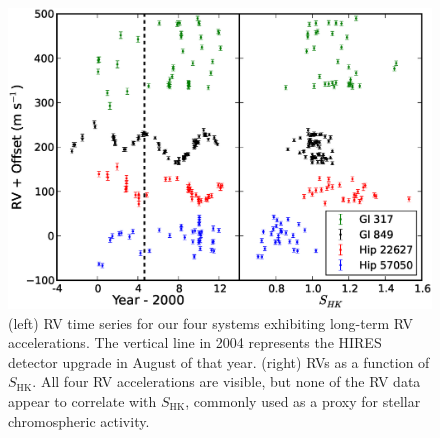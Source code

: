 \begin{figure}[htbp]
\centerline{\includegraphics[width=1.0\textwidth]{chapter3/f19.eps}}
\caption[RV time series for our four systems exhibiting long-term RV accelerations and RVs as a function of $S_\textrm{HK}$]{(left) RV time series for our four systems exhibiting long-term RV accelerations. The vertical line in 2004 represents the HIRES detector upgrade in August of that year. (right) RVs as a function of $S_\textrm{HK}$. All four RV accelerations are visible, but none of the RV data appear to correlate with $S_\textrm{HK}$, commonly used as a proxy for stellar chromospheric activity.
  }
\label{Trendplot}
\end{figure}

